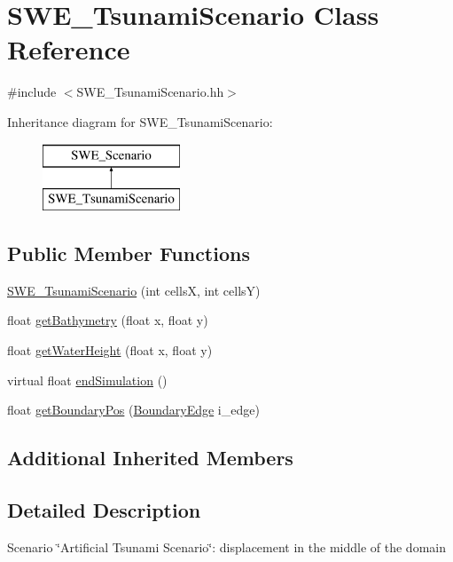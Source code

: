 \hypertarget{classSWE__TsunamiScenario}{\section{S\-W\-E\-\_\-\-Tsunami\-Scenario Class Reference}
\label{classSWE__TsunamiScenario}
}


{\ttfamily \#include $<$S\-W\-E\-\_\-\-Tsunami\-Scenario.\-hh$>$}

Inheritance diagram for S\-W\-E\-\_\-\-Tsunami\-Scenario\-:\begin{figure}[H]
\begin{center}
\leavevmode
\includegraphics[height=2.000000cm]{classSWE__TsunamiScenario}
\end{center}
\end{figure}
\subsection*{Public Member Functions}
\begin{DoxyCompactItemize}
\item 
\hyperlink{classSWE__TsunamiScenario_ae14887eeebe3d8b6e89ac9924eb6615b}{S\-W\-E\-\_\-\-Tsunami\-Scenario} (int cells\-X, int cells\-Y)
\item 
float \hyperlink{classSWE__TsunamiScenario_aa2d2b0be8c3bc1d84ded47e075b5d433}{get\-Bathymetry} (float x, float y)
\item 
float \hyperlink{classSWE__TsunamiScenario_a134b99facf6169d2ef1edf0e5199b736}{get\-Water\-Height} (float x, float y)
\item 
virtual float \hyperlink{classSWE__TsunamiScenario_a0576923dc02b543dc34cec7de6e451a4}{end\-Simulation} ()
\item 
float \hyperlink{classSWE__TsunamiScenario_a701145868edb572d5958bbd739b80e0d}{get\-Boundary\-Pos} (\hyperlink{SWE__Scenario_8hh_aa5e01e3f7df312f7b9b0d02521141fcc}{Boundary\-Edge} i\-\_\-edge)
\end{DoxyCompactItemize}
\subsection*{Additional Inherited Members}


\subsection{Detailed Description}
Scenario \char`\"{}\-Artificial Tsunami Scenario\char`\"{}\-: displacement in the middle of the domain 

